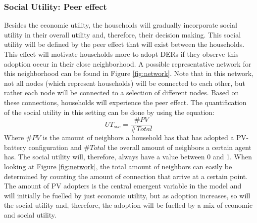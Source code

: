 \subsubsection{Social Utility: Peer effect}
Besides the economic utility, the households will gradually incorporate social utility in their overall utility and, therefore, their decision making. This social utility will be defined by the peer effect that will exist between the households. This effect will motivate households more to adopt DERs if they observe this adoption occur in their close neighborhood. A possible representative network for this neighborhood can be found in Figure \ref{fig:network}.
\noindent
Note that in this network, not all nodes (which represent households) will be connected to each other, but rather each node will be connected to a selection of different nodes. Based on these connections, households will experience the peer effect. The quantification of the social utility in this setting can be done by using the equation:
\noindent
\begin{equation}
    UT_{soc} = \frac{\#PV}{\#Total}
\end{equation}
Where $\#PV$ is the amount of neighbors a household has that has adopted a PV-battery configuration and $\#Total$ the overall amount of neighbors a certain agent has. The social utility will, therefore, always have a value between 0 and 1. When looking at Figure \ref{fig:network}, the total amount of neighbors can easily be determined by counting the amount of connection that arrive at a certain point. The amount of PV adopters is the central emergent variable in the model and will initially be fuelled by just economic utility, but as adoption increases, so will the social utility and, therefore, the adoption will be fuelled by a mix of economic and social utility.
